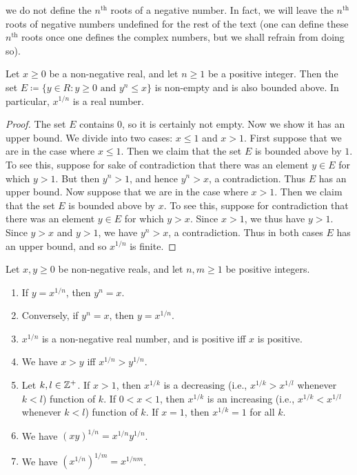 \begin{note}
  we do not define the \(n^{\text{th}}\) roots of a negative number.
  In fact, we will leave the \(n^{\text{th}}\) roots of negative numbers undefined for the rest of the text
  (one can define these \(n^{\text{th}}\) roots once one defines the complex numbers, but we shall refrain from doing so).
\end{note}

\begin{lem}\label{5.6.5}
  Let \(x \geq 0\) be a non-negative real, and let \(n \geq 1\) be a positive integer.
  Then the set \(E \coloneqq \{y \in R : y \geq 0 \text{ and } y^n \leq x\}\) is non-empty and is also bounded above.
  In particular, \(x^{1 / n}\) is a real number.
\end{lem}

\begin{proof}
  The set \(E\) contains \(0\), so it is certainly not empty.
  Now we show it has an upper bound.
  We divide into two cases: \(x \leq 1\) and \(x > 1\).
  First suppose that we are in the case where \(x \leq 1\).
  Then we claim that the set \(E\) is bounded above by \(1\).
  To see this, suppose for sake of contradiction that there was an element \(y \in E\) for which \(y > 1\).
  But then \(y^n > 1\), and hence \(y^n > x\), a contradiction.
  Thus \(E\) has an upper bound.
  Now suppose that we are in the case where \(x > 1\).
  Then we claim that the set \(E\) is bounded above by \(x\).
  To see this, suppose for contradiction that there was an element \(y \in E\) for which \(y > x\).
  Since \(x > 1\), we thus have \(y > 1\).
  Since \(y > x\) and \(y > 1\), we have \(y^n > x\), a contradiction.
  Thus in both cases \(E\) has an upper bound, and so \(x^{1 / n}\) is finite.
\end{proof}

\begin{lem}\label{5.6.6}
  Let \(x, y \geq 0\) be non-negative reals, and let \(n, m \geq 1\) be positive integers.
  \begin{enumerate}
    \item If \(y = x^{1 / n}\), then \(y^n = x\).
    \item Conversely, if \(y^n = x\), then \(y = x^{1 / n}\).
    \item \(x^{1 / n}\) is a non-negative real number, and is positive iff \(x\) is positive.
    \item We have \(x > y\) iff \(x^{1 / n} > y^{1 / n}\).
    \item Let \(k, l \in \mathbb{Z}^+\).
          If \(x > 1\), then \(x^{1 / k}\) is a decreasing (i.e., \(x^{1 / k} > x^{1 / l}\) whenever \(k < l\)) function of \(k\).
          If \(0 < x < 1\), then \(x^{1 / k}\) is an increasing (i.e., \(x^{1 / k} < x^{1 / l}\) whenever \(k < l\)) function of \(k\).
          If \(x = 1\), then \(x^{1 / k} = 1\) for all \(k\).
    \item We have \((xy)^{1 / n} = x^{1 / n} y^{1 / n}\).
    \item We have \((x^{1 / n})^{1 / m} = x^{1 / nm}\).
  \end{enumerate}
\end{lem}

